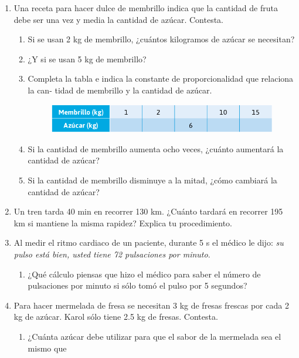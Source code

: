 \documentclass[11pt]{book}
\begin{document}
\begin{enumerate}
  \item Una receta para hacer dulce de membrillo indica que la cantidad de fruta debe
        ser una vez y media la cantidad de azúcar. Contesta.
        \begin{enumerate}
          \item Si se usan 2 kg de membrillo, ¿cuántos kilogramos de azúcar se necesitan?
          \item ¿Y si se usan 5 kg de membrillo?
          \item Completa la tabla e indica la constante de proporcionalidad que relaciona la can-
                tidad de membrillo y la cantidad de azúcar.
                \begin{figure}[H]
                  \centering
                  \includegraphics[width=0.6\linewidth]{tabla_azucar.png}
                  \label{tab:tabla_azucar}
                \end{figure}
          \item Si la cantidad de membrillo aumenta ocho veces, ¿cuánto aumentará la cantidad
                de azúcar?
          \item Si la cantidad de membrillo disminuye a la mitad, ¿cómo cambiará la cantidad de
                azúcar?
        \end{enumerate}
  \item Un tren tarda 40 min en recorrer 130 km. ¿Cuánto tardará en recorrer 195 km si
        mantiene la misma rapidez? Explica tu procedimiento.
  \item Al medir el ritmo cardiaco de un paciente, durante 5 s el médico le dijo: \emph{su
          pulso está bien, usted tiene 72 pulsaciones por minuto}.
        \begin{enumerate}
          \item ¿Qué cálculo piensas que hizo el médico para saber el número de pulsaciones por minuto si sólo tomó el pulso por 5 segundos?
        \end{enumerate}
  \item Para hacer mermelada de fresa se necesitan 3 kg de fresas frescas por cada 2 kg
        de azúcar. Karol sólo tiene 2.5 kg de fresas. Contesta.
        \begin{enumerate}
          \item ¿Cuánta azúcar debe utilizar para que el sabor de la mermelada sea el mismo que

\end{enumerate}
\end{enumerate}
\end{document}
